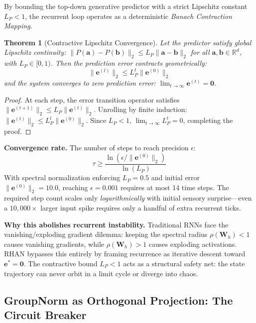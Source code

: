 \documentclass[12pt,a4paper]{article}
\newtheorem{theorem}{Theorem}[section]
\begin{document}
By bounding the top-down generative predictor with a strict Lipschitz
constant $L_P < 1$, the recurrent loop operates as a deterministic
\textit{Banach Contraction Mapping}.

\begin{theorem}[Contractive Lipschitz Convergence]
\label{thm:banach}
Let the predictor satisfy global Lipschitz continuity:
$\|P(\mathbf{a}) - P(\mathbf{b})\|_2 \le L_P \|\mathbf{a} - \mathbf{b}\|_2$
for all $\mathbf{a}, \mathbf{b} \in \mathbb{R}^d$, with $L_P \in [0, 1)$.
Then the prediction error contracts geometrically:
\begin{equation}
  \|\mathbf{e}^{(t)}\|_2 \le L_P^t \|\mathbf{e}^{(0)}\|_2
  \label{eq:banach_bound}
\end{equation}
and the system converges to zero prediction error:
$\lim_{t \to \infty} \mathbf{e}^{(t)} = \mathbf{0}$.
\end{theorem}

\begin{proof}
At each step, the error transition operator satisfies
$\|\mathbf{e}^{(t+1)}\|_2 \le L_P \|\mathbf{e}^{(t)}\|_2$. Unrolling by
finite induction: $\|\mathbf{e}^{(t)}\|_2 \le L_P^t \|\mathbf{e}^{(0)}\|_2$.
Since $L_P < 1$, $\lim_{t \to \infty} L_P^t = 0$, completing the proof.
\end{proof}

\textbf{Convergence rate.} The number of steps to reach precision $\epsilon$:
\begin{equation}
  \tau \ge \frac{\ln(\epsilon / \|\mathbf{e}^{(0)}\|_2)}{\ln(L_P)}
\end{equation}
With spectral normalization enforcing $L_P = 0.5$ and initial error
$\|\mathbf{e}^{(0)}\|_2 = 10.0$, reaching $\epsilon = 0.001$ requires at
most 14 time steps. The required step count scales only
\textit{logarithmically} with initial sensory surprise---even a $10{,}000\times$
larger input spike requires only a handful of extra recurrent ticks.

\textbf{Why this abolishes recurrent instability.} Traditional RNNs face
the vanishing/exploding gradient dilemma: keeping the spectral radius
$\rho(\mathbf{W}_h) < 1$ causes vanishing gradients, while
$\rho(\mathbf{W}_h) > 1$ causes exploding activations. RHAN bypasses this
entirely by framing recurrence as iterative descent toward
$\mathbf{e}^* = \mathbf{0}$. The contractive bound $L_P < 1$ acts as a
structural safety net: the state trajectory can never orbit in a limit cycle
or diverge into chaos.

\subsection{GroupNorm as Orthogonal Projection: The Circuit Breaker}
\label{sec:groupnorm}
\end{document}

